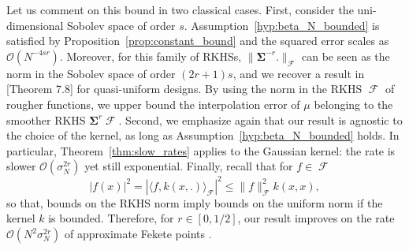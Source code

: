 \documentclass[twoside,11pt]{book}
\DeclareMathOperator{\F}{\mathcal{F}}
\begin{document}
Let us comment on this bound in two classical cases. First, consider the uni-dimensional Sobolev space of order $s$. Assumption~\ref{hyp:beta_N_bounded} is satisfied by Proposition~\ref{prop:constant_bound} and the squared error scales as $\mathcal{O}(N^{-4sr})$. Moreover, for this family of RKHSs, $\|\bm{\Sigma}^{-r}.\|_{\F}$ can be seen as the norm in the Sobolev space of order $(2r+1)s$, and we recover a result in \citep{ScWe06}[Theorem 7.8] for quasi-uniform designs. By using the norm in the RKHS $\F$ of rougher functions, we upper bound the interpolation error of $\mu$ belonging to the smoother RKHS $\bm{\Sigma}^{r} \F$. Second, we emphasize again that our result is agnostic to the choice of the kernel, as long as Assumption~\ref{hyp:beta_N_bounded} holds. In particular, Theorem~\ref{thm:slow_rates} applies to the Gaussian kernel: the rate is slower $\mathcal{O}(\sigma_{N}^{2r})$ yet still exponential. Finally, recall that for $f \in \F$
\begin{equation}
|f(x)|^{2} = |\langle f, k(x,.)\rangle_{\F}|^{2} \leq\|f\|_{\F}^{2} k(x,x),
\end{equation}
so that, bounds on the RKHS norm imply bounds on the uniform norm if the kernel $k$ is bounded. Therefore, for $r \in [0,1/2]$, our result improves on the rate $\mathcal{O}(N^{2}\sigma_{N}^{2r})$ of approximate Fekete points \citep{KaSaTa19}.



\end{document}

